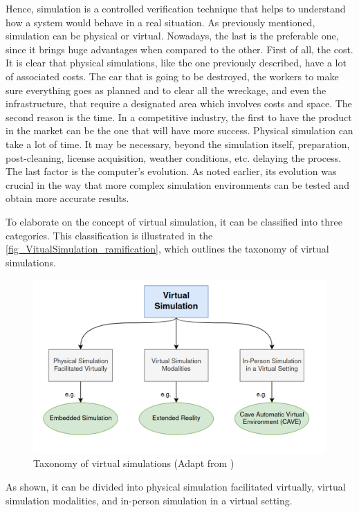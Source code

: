 Hence, simulation is a controlled verification technique that helps to understand how a system would behave in a real situation. As previously 
mentioned, simulation can be physical or virtual. Nowadays, the last is the preferable one, since it brings huge advantages when compared to the 
other. First of all, the cost. It is clear that physical simulations, like the one previously described, have a lot of associated costs. The car 
that is going to be destroyed, the workers to make sure everything goes as planned and to clear all the wreckage, and even the infrastructure, 
that require a designated area which involves costs and space. The second reason is the time. In a competitive industry, the first to have the 
product in the market can be the one that will have more success. Physical simulation can take a lot of time. It may be necessary, beyond the 
simulation itself, preparation, post-cleaning, license acquisition, weather conditions, etc. delaying the process. The last factor is the 
computer's evolution. As noted earlier, its evolution was crucial in the way that more complex simulation environments can be tested and obtain 
more accurate results.

To elaborate on the concept of virtual simulation, it can be classified into three categories. This classification is illustrated in 
the  \autoref{fig_VitualSimulation_ramification}, which outlines the taxonomy of virtual simulations. 

\begin{figure}[H]
	\centering
 	\includegraphics[width=0.7\linewidth]{Images/VitualSimulation_ramification.png}
 	\caption{Taxonomy of virtual simulations (Adapt from \cite{verkuyl2022virtual})}
	 \label{fig_VitualSimulation_ramification}
\end{figure}


As shown, it can be divided into physical simulation facilitated virtually, virtual simulation modalities, and in-person simulation in a 
virtual setting. 

